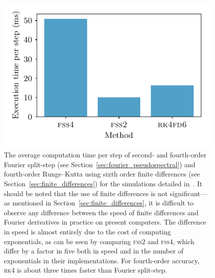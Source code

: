 \begin{figure}[t]
    \centerfloat
    \includegraphics{figures/numerics/method_speeds.pdf}
    \caption{The average computation time per step of second- and fourth-order Fourier split-step (see Section~\ref{sec:fourier_pseudospectral}) and fourth-order Runge--Kutta using sixth order finite differences (see Section~\ref{sec:finite_differences}) for the simulations detailed in~. It should be noted that the use of finite differences is not significant---as mentioned in Section~\ref{sec:finite_differences}, it is difficult to observe any difference between the speed of finite differences and Fourier derivatives in practice on present computers. The difference in speed is almost entirely due to the cost of computing exponentials, as can be seen by comparing \textsc{fss2} and \textsc{fss4}, which differ by a factor in five both in speed and in the number of exponentials in their implementations. For fourth-order accuracy, \textsc{rk4} is about three times faster than Fourier split-step.}
    \label{fig:method_speeds}
\end{figure}

